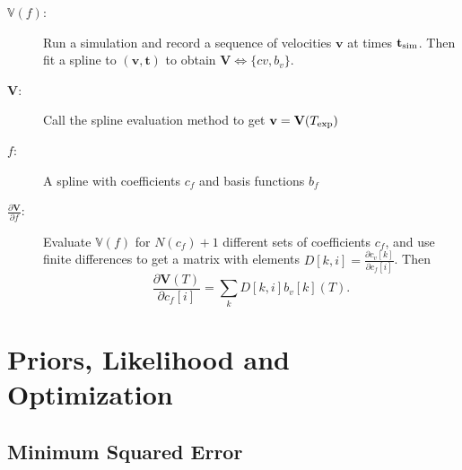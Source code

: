 \documentclass[11pt]{article}
\newcommand{\partiald}[2]{\frac{\partial #1}{\partial #2}}
\newcommand\bv{\mathbf{v}}
\newcommand\bt{\mathbf{t}}
\newcommand\Vfunc{\mathbb{V}}
\newcommand\Vt{\mathbf{V}}
\newcommand\texp{T_{\rm{exp}}}
\newcommand\cf{c_f}
\newcommand\cv{c_v}
\newcommand\fbasis{b_f}
\newcommand\vbasis{b_v}
\newcommand\tsim{{\mathbf t}_{\rm{sim}}}
\newcommand\DVDf{\partiald{\Vt}{f}}
\begin{document}
\begin{description}
\item[$\Vfunc(f)$:] Run a simulation and record a sequence of
  velocities $\bv$ at times $\tsim$.  Then fit a
  spline to $(\bv, \bt)$ to obtain $\Vt\iff \{cv,\vbasis\}$.
\item[$\Vt$:] Call the spline evaluation method to get $\bv = \Vt(\texp)$
\item[$f$:] A spline with coefficients $\cf$ and basis functions
  $\fbasis$
\item[$\DVDf$:] Evaluate $\Vfunc(f)$ for $N(\cf)+1$ different sets of
  coefficients $\cf$, and use finite differences to get a matrix with
  elements $D[k,i] = \partiald{\cv[k]}{\cf[i]}$.  Then
  \begin{equation*}
    \partiald{\Vt(T)}{\cf[i]} = \sum_k D[k,i] \vbasis[k](T).
  \end{equation*}
\end{description}

\section{Priors, Likelihood and Optimization}
\label{sec:opt}

\subsection{Minimum Squared Error}
\label{sec:minsq}
\end{document}
